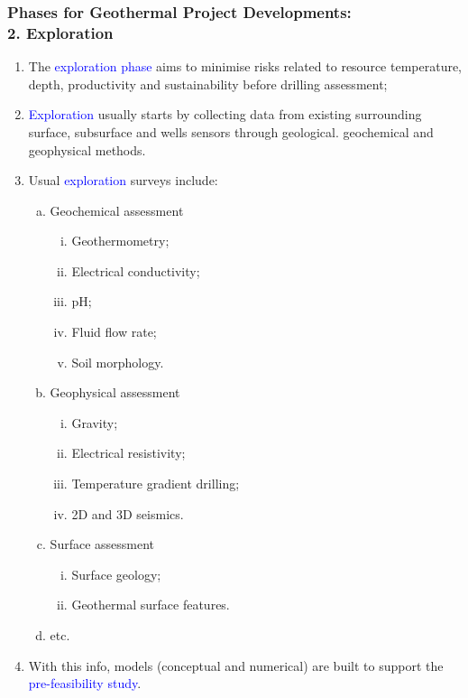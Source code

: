\documentclass[10pt,compress]{beamer}
\newcommand{\blue}{\textcolor{blue}}
\begin{document}
\begin{frame}
 \frametitle{Phases for Geothermal Project Developments: \\ 2. Exploration} 

    \begin{enumerate}[{2.}1]\scriptsize
       \item <1-> The \blue{exploration phase} aims to minimise risks related to resource temperature, depth, productivity and sustainability before drilling assessment;
       \item <2-> \blue{Exploration} usually starts by collecting data from existing surrounding surface, subsurface and wells sensors through geological. geochemical and geophysical methods.
       \item <3-> Usual \blue{exploration} surveys include:
          \begin{enumerate}[(a)]\scriptsize
             \item<4-> Geochemical assessment
                \begin{enumerate}[i)]\scriptsize
                   \item<4-> Geothermometry;
                   \item<4-> Electrical conductivity;
                   \item<4-> pH;
                   \item<4-> Fluid flow rate;
                   \item<4-> Soil morphology.
                \end{enumerate}
             \item<5-> Geophysical assessment
                \begin{enumerate}[i)]\scriptsize
                   \item<5-> Gravity;
                   \item<5-> Electrical resistivity;
                   \item<5-> Temperature gradient drilling;
                   \item<5-> 2D and 3D seismics.
                \end{enumerate}
             \item<6-> Surface assessment
                \begin{enumerate}[i)]\scriptsize
                   \item<6-> Surface geology;
                   \item<6-> Geothermal surface features.
                \end{enumerate}
             \item<7-> etc.
          \end{enumerate}
       \item <8-> With this info, models (conceptual and numerical) are built to support the \blue{pre-feasibility study}. 
    \end{enumerate}
\end{frame}
 
\end{document}
